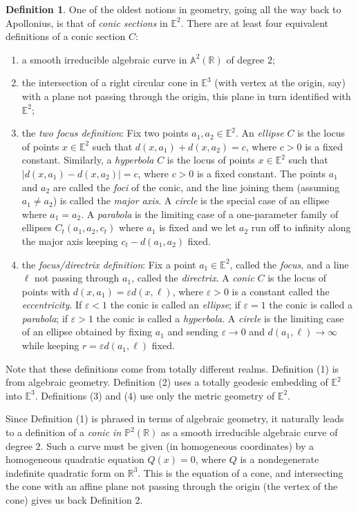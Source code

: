 \documentclass[12pt]{amsart}
\theoremstyle{definition}
\newtheorem{definition}[theorem]{Definition}
\begin{document}
\begin{definition}
  \label{def:Euclconics}
One of the oldest notions in
geometry, going all the way back to Apollonius, is that of \emph{conic
  sections} in ${\mathbb E}^2$. There are at least four equivalent
definitions of a conic section $C$:
\begin{enumerate}
\item a smooth irreducible algebraic curve in ${\mathbb A}^2({\mathbb R})$ of degree $2$;
\item the intersection of a right circular
  cone in ${\mathbb E}^3$ (with vertex at the origin, say)
  with a plane not passing through the origin, this plane in turn
  identified with ${\mathbb E}^2$;
\item the \emph{two focus definition}: Fix two points $a_1, a_2\in
  {\mathbb E}^2$. An \emph{ellipse} $C$ is the locus of points $x\in {\mathbb E}^2$ such that
  $d(x,a_1) + d(x,a_2) = c$, where $c>0$ is a fixed
  constant. Similarly, a \emph{hyperbola} $C$ is the locus of points
  $x\in {\mathbb E}^2$ such that   $\left\vert d(x,a_1) - d(x,a_2)\right\vert =
  c$, where $c>0$ is a fixed constant. The points $a_1$ and $a_2$ are
  called the \emph{foci} of the conic, and the line joining
  them (assuming $a_1\ne a_2$) is called the \emph{major axis}.   A
  \emph{circle} is the 
  special case of an ellipse where $a_1=a_2$. A \emph{parabola} is the
  limiting case of a one-parameter family of ellipses $C_t(a_1,a_2,c_t)$ where
  $a_1$ is fixed and we let $a_2$ run off to infinity along the major
  axis keeping $c_t-d(a_1,a_2)$ fixed.
\item the \emph{focus/directrix definition}: Fix a point $a_1\in
  {\mathbb E}^2$, called the \emph{focus}, and a line $\ell$ not passing
  through $a_1$, called the \emph{directrix}. A \emph{conic} $C$ is
  the locus of points with $d(x,a_1)=\varepsilon d(x, \ell)$, where
  $\varepsilon >0$ is a constant called the \emph{eccentricity}. If
  $\varepsilon <1$ the conic is 
  called an \emph{ellipse}; if $\varepsilon=1$ the conic is
  called a \emph{parabola}; if $\varepsilon>1$ the conic is
  called a \emph{hyperbola}.  A \emph{circle} is the limiting case of an
  ellipse obtained by fixing $a_1$ and sending $\varepsilon\to 0$ and $d(a_1,
  \ell)\to \infty$ while keeping $r= \varepsilon d(a_1, \ell)$ fixed.
\end{enumerate}
Note that these definitions come from totally different realms.
Definition (1) is from algebraic geometry. Definition (2) uses a
totally geodesic embedding of ${\mathbb E}^2$ into ${\mathbb E}^3$.  Definitions (3)
and (4) use only the metric geometry of ${\mathbb E}^2$.

Since Definition (1) is phrased in terms of algebraic geometry, it
naturally leads to a definition of a \emph{conic in ${\mathbb P}^2({\mathbb R})$} as a smooth
irreducible algebraic curve of degree $2$. Such a curve must be given
(in homogeneous coordinates) by a homogeneous quadratic equation
$Q(x)=0$, where $Q$ is a nondegenerate indefinite quadratic form on
${\mathbb R}^3$. This is the equation of a cone, and intersecting the cone
with an affine plane not passing through the origin (the vertex of the
cone) gives us back Definition 2. 
\end{definition}
\end{document}
